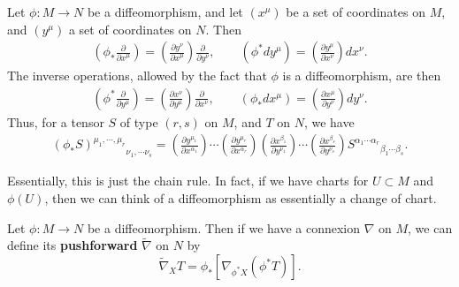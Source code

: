 \documentclass[12pt]{article}
\begin{document}
\begin{noteEquation}
	Let $\phi: M \to N$ be a diffeomorphism, and let $(x^\mu)$ be a set of coordinates on $M$, and $(y^\mu)$ a set of coordinates on $N$. Then
	\begin{align}
		\left( \phi_* \frac{\partial}{\partial x^\mu} \right) 
		= \left( \frac{\partial y^\nu}{\partial x^ \mu} \right) \frac{\partial }{\partial y^\nu}, 
			\qquad
		\left( \phi^* dy^\mu \right) = \left( \frac{\partial y^\mu }{\partial x^\nu} \right) dx^\nu.
	\end{align}
	The inverse operations, allowed by the fact that $\phi$ is a diffeomorphism, are then
	\begin{align}
		\left( \phi^* \frac{\partial}{\partial y^\mu} \right) 
		= \left( \frac{\partial x^\nu}{\partial y^\mu} \right) \frac{\partial}{\partial x^\nu},
			\qquad
		\left( \phi_* dx^\mu \right) 
		= \left(\frac{\partial x^\mu }{\partial y^\nu} \right) dy^\nu.
	\end{align}
	Thus, for a tensor $S$ of type $(r,s)$ on $M$, and $T$ on $N$, we have
	\begin{align}
		{\left( \phi_* S \right)^{\mu_1, \cdots, \mu_r}}_{\nu_1, \cdots \nu_s} = \left( \frac{\partial y^{\mu_1}}{\partial x^{\alpha_1}}\right) \cdots \left( \frac{\partial y^{\mu_r}}{\partial x^{\alpha_r}}\right)
		\left( \frac{\partial x^{\beta_1}}{\partial y^{\nu_1} }\right) \cdots
		\left( \frac{\partial x^{\beta_s}}{\partial y^{\nu_s} }\right)
		{S^{\alpha_1 \cdots \alpha_r}}_{\beta_1 \cdots \beta_s}.
	\end{align}
\end{noteEquation}
\begin{remark}
	Essentially, this is just the chain rule. In fact, if we have charts for $U \subset M$ and $\phi(U)$, then we can think of a diffeomorphism as essentially a change of chart. 
\end{remark}

\begin{definition}
	Let $\phi: M \to N$ be a diffeomorphism. Then if we have a connexion $\nabla$ on $M$, we can define its \textbf{pushforward} $\tilde{\nabla}$ on $N$ by
		\begin{equation}
			\tilde{\nabla}_X T = \phi_* \left[ \nabla_{\phi^* X} ( \phi^* T) \right].
		\end{equation}
\end{definition}
\end{document}
